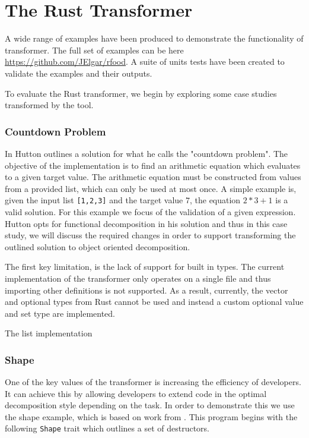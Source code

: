 \documentclass[ oneside,%
                    author={James Elgar},
                    degree={MEng},
                     title={Bidirectional transformer between functional and \\ object-oriented programming in Rust},
                  subtitle={}]{dissertation}
\newcommand{\rust}[1]{\texttt{#1}}
\begin{document}

\section{The Rust Transformer}

A wide range of examples have been produced to demonstrate the functionality of transformer. The full set of examples can be here \url{https://github.com/JElgar/rfood}. A suite of units tests have been created to validate the examples and their outputs.

To evaluate the Rust transformer, we begin by exploring some case studies transformed by the tool. 

\subsubsection{Countdown Problem}

In \cite{hutton} Hutton outlines a solution for what he calls the "countdown problem". The objective of the implementation is to find an arithmetic equation which evaluates to a given target value. The arithmetic equation must be constructed from values from a provided list, which can only be used at most once. A simple example is, given the input list \rust{[1,2,3]} and the target value $7$, the equation $2 * 3 + 1$ is a valid solution. For this example we focus of the validation of a given expression. Hutton opts for functional decomposition in his solution and thus in this case study, we will discuss the required changes in order to support transforming the outlined solution to object oriented decomposition.

The first key limitation, is the lack of support for built in types. The current implementation of the transformer only operates on a single file and thus importing other definitions is not supported. As a result, currently, the vector and optional types from Rust cannot be used and instead a custom optional value and set type are implemented.

The list implementation 
 
\subsubsection{Shape}

One of the key values of the transformer is increasing the efficiency of developers. It can achieve this by allowing developers to extend code in the optimal decomposition style depending on the task. In order to demonstrate this we use the shape example, which is based on work from \cite{oopdesign}. This program begins with the following \rust{Shape} trait which outlines a set of destructors. 
\end{document}
